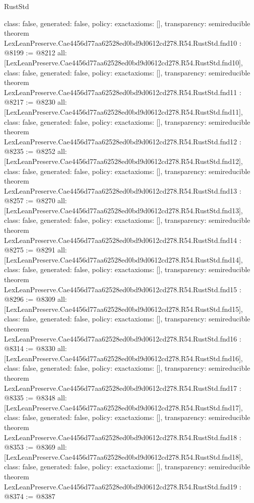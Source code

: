 \begin{lexlean}{RustStd}
\begin{coremodule}
{  class: false,
  generated: false,
  policy: exact{axioms: []},
  transparency: semireducible
}
theorem LexLeanPreserve.Cae4456d77aa62528ed0bd9d0612cd278.R54.RustStd.fnd10 : @8199 := @8212 {
  all: [LexLeanPreserve.Cae4456d77aa62528ed0bd9d0612cd278.R54.RustStd.fnd10],
  class: false,
  generated: false,
  policy: exact{axioms: []},
  transparency: semireducible
}
theorem LexLeanPreserve.Cae4456d77aa62528ed0bd9d0612cd278.R54.RustStd.fnd11 : @8217 := @8230 {
  all: [LexLeanPreserve.Cae4456d77aa62528ed0bd9d0612cd278.R54.RustStd.fnd11],
  class: false,
  generated: false,
  policy: exact{axioms: []},
  transparency: semireducible
}
theorem LexLeanPreserve.Cae4456d77aa62528ed0bd9d0612cd278.R54.RustStd.fnd12 : @8235 := @8252 {
  all: [LexLeanPreserve.Cae4456d77aa62528ed0bd9d0612cd278.R54.RustStd.fnd12],
  class: false,
  generated: false,
  policy: exact{axioms: []},
  transparency: semireducible
}
theorem LexLeanPreserve.Cae4456d77aa62528ed0bd9d0612cd278.R54.RustStd.fnd13 : @8257 := @8270 {
  all: [LexLeanPreserve.Cae4456d77aa62528ed0bd9d0612cd278.R54.RustStd.fnd13],
  class: false,
  generated: false,
  policy: exact{axioms: []},
  transparency: semireducible
}
theorem LexLeanPreserve.Cae4456d77aa62528ed0bd9d0612cd278.R54.RustStd.fnd14 : @8275 := @8291 {
  all: [LexLeanPreserve.Cae4456d77aa62528ed0bd9d0612cd278.R54.RustStd.fnd14],
  class: false,
  generated: false,
  policy: exact{axioms: []},
  transparency: semireducible
}
theorem LexLeanPreserve.Cae4456d77aa62528ed0bd9d0612cd278.R54.RustStd.fnd15 : @8296 := @8309 {
  all: [LexLeanPreserve.Cae4456d77aa62528ed0bd9d0612cd278.R54.RustStd.fnd15],
  class: false,
  generated: false,
  policy: exact{axioms: []},
  transparency: semireducible
}
theorem LexLeanPreserve.Cae4456d77aa62528ed0bd9d0612cd278.R54.RustStd.fnd16 : @8314 := @8330 {
  all: [LexLeanPreserve.Cae4456d77aa62528ed0bd9d0612cd278.R54.RustStd.fnd16],
  class: false,
  generated: false,
  policy: exact{axioms: []},
  transparency: semireducible
}
theorem LexLeanPreserve.Cae4456d77aa62528ed0bd9d0612cd278.R54.RustStd.fnd17 : @8335 := @8348 {
  all: [LexLeanPreserve.Cae4456d77aa62528ed0bd9d0612cd278.R54.RustStd.fnd17],
  class: false,
  generated: false,
  policy: exact{axioms: []},
  transparency: semireducible
}
theorem LexLeanPreserve.Cae4456d77aa62528ed0bd9d0612cd278.R54.RustStd.fnd18 : @8353 := @8369 {
  all: [LexLeanPreserve.Cae4456d77aa62528ed0bd9d0612cd278.R54.RustStd.fnd18],
  class: false,
  generated: false,
  policy: exact{axioms: []},
  transparency: semireducible
}
theorem LexLeanPreserve.Cae4456d77aa62528ed0bd9d0612cd278.R54.RustStd.fnd19 : @8374 := @8387 {
}
\end{coremodule}
\end{lexlean}
